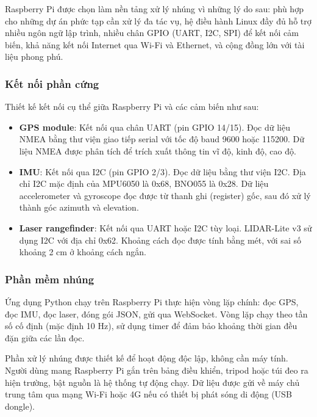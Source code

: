 \hspace{0.5cm} Raspberry Pi được chọn làm nền tảng xử lý nhúng vì những lý do sau: phù hợp cho những dự án phức tạp cần xử lý đa tác vụ, hệ điều hành Linux đầy đủ hỗ trợ nhiều ngôn ngữ lập trình, nhiều chân GPIO (UART, I2C, SPI) để kết nối cảm biến, khả năng kết nối Internet qua Wi-Fi và Ethernet, và cộng đồng lớn với tài liệu phong phú.

\subsubsection{Kết nối phần cứng}

\hspace{0.5cm} Thiết kế kết nối cụ thể giữa Raspberry Pi và các cảm biến như sau:

\begin{itemize}
    \item \textbf{GPS module}: Kết nối qua chân UART (pin GPIO 14/15). Đọc dữ liệu NMEA bằng thư viện giao tiếp serial với tốc độ baud 9600 hoặc 115200. Dữ liệu NMEA được phân tích để trích xuất thông tin vĩ độ, kinh độ, cao độ.
    \item \textbf{IMU}: Kết nối qua I2C (pin GPIO 2/3). Đọc dữ liệu bằng thư viện I2C. Địa chỉ I2C mặc định của MPU6050 là 0x68, BNO055 là 0x28. Dữ liệu accelerometer và gyroscope đọc được từ thanh ghi (register) gốc, sau đó xử lý thành góc azimuth và elevation.
    \item \textbf{Laser rangefinder}: Kết nối qua UART hoặc I2C tùy loại. LIDAR-Lite v3 sử dụng I2C với địa chỉ 0x62. Khoảng cách đọc được tính bằng mét, với sai số khoảng 2 cm ở khoảng cách ngắn.
\end{itemize}

\subsubsection{Phần mềm nhúng}

\hspace{0.5cm} Ứng dụng Python chạy trên Raspberry Pi thực hiện vòng lặp chính: đọc GPS, đọc IMU, đọc laser, đóng gói JSON, gửi qua WebSocket. Vòng lặp chạy theo tần số cố định (mặc định 10 Hz), sử dụng timer để đảm bảo khoảng thời gian đều đặn giữa các lần đọc.

Phần xử lý nhúng được thiết kế để hoạt động độc lập, không cần máy tính. Người dùng mang Raspberry Pi gắn trên bảng điều khiển, tripod hoặc túi đeo ra hiện trường, bật nguồn là hệ thống tự động chạy. Dữ liệu được gửi về máy chủ trung tâm qua mạng Wi-Fi hoặc 4G nếu có thiết bị phát sóng di động (USB dongle).

